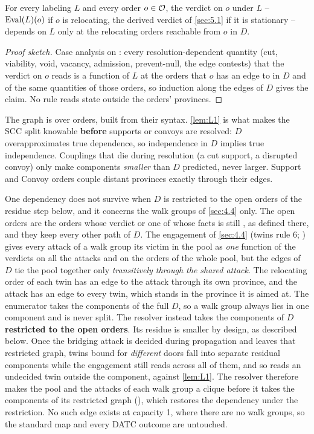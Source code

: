 \documentclass[12pt,a4paper]{article}
\begin{document}
\begin{lemma}\label{lem:L1}
For every labeling $L$ and every order $o \in \mathcal{O}$, the verdict on $o$ under $L$ -- $\operatorname{Eval}(L)(o)$ if $o$ is relocating, the derived verdict of \cref{sec:5.1} if it is stationary -- depends on $L$ only at the relocating orders reachable from $o$ in $D$.
\end{lemma}
\begin{proof}[Proof sketch]
Case analysis on : every resolution-dependent quantity (cut, viability, void, vacancy, admission, prevent-null, the edge contests) that the verdict on $o$ reads is a function of $L$ at the orders that $o$ has an edge to in $D$ and of the same quantities of those orders, so induction along the edges of $D$ gives the claim.
No rule reads state outside the orders' provinces.
\end{proof}

The graph is over orders, built from their syntax.
\cref{lem:L1} is what makes the SCC split knowable \textbf{before} supports or convoys are resolved: $D$ overapproximates true dependence, so independence in $D$ implies true independence.
Couplings that die during resolution (a cut support, a disrupted convoy) only make components \emph{smaller} than $D$ predicted, never larger.
Support and Convoy orders couple distant provinces exactly through their edges.

One dependency does not survive when $D$ is restricted to the open orders of the residue step below, and it concerns the walk groups of \cref{sec:4.4} only.
The open orders are the orders whose verdict or one of whose facts is still , as defined there, and they keep every other path of $D$.
The engagement of \cref{sec:4.4} (twins rule 6; ) gives every attack of a walk group its victim in the pool as \emph{one} function of the verdicts on all the attacks and on the orders of the whole pool, but the edges of $D$ tie the pool together only \emph{transitively through the shared attack}.
The relocating order of each twin has an edge to the attack through its own province, and the attack has an edge to every twin, which stands in the province it is aimed at.
The enumerator takes the components of the full $D$, so a walk group always lies in one component and is never split.
The resolver instead takes the components of $D$ \textbf{restricted to the open orders}.
Its residue is smaller by design, as described below.
Once the bridging attack is decided during propagation and leaves that restricted graph, twins bound for \emph{different} doors fall into separate residual components while the engagement still reads across all of them, and so reads an undecided twin outside the component, against \cref{lem:L1}.
The resolver therefore makes the pool and the attacks of each walk group a clique before it takes the components of its restricted graph (), which restores the dependency under the restriction.
No such edge exists at capacity 1, where there are no walk groups, so the standard map and every DATC outcome are untouched.
\end{document}
